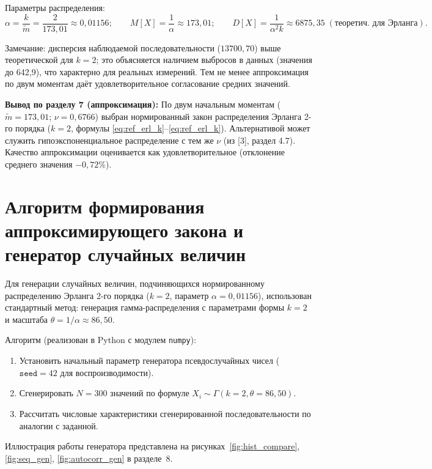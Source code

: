 \documentclass[a4paper,12pt]{article}
\begin{document}
Параметры распределения:
\begin{equation*}
\alpha = \frac{k}{\tilde{m}} = \frac{2}{173{,}01} \approx 0{,}01156; \qquad
M[X] = \frac{1}{\alpha} \approx 173{,}01; \qquad D[X] = \frac{1}{\alpha^2 k} \approx 6875{,}35 \; (\text{теоретич. для Эрланга}).
\end{equation*}

Замечание: дисперсия наблюдаемой последовательности ($13700{,}70$) выше теоретической для $k=2$; это объясняется наличием выбросов в данных (значения до 642,9), что характерно для реальных измерений. Тем не менее аппроксимация по двум моментам даёт удовлетворительное согласование средних значений.

\textbf{Вывод по разделу 7 (аппроксимация):} По двум начальным моментам ($\tilde{m}=173{,}01$; $\nu=0{,}6766$) выбран нормированный закон распределения Эрланга 2-го порядка ($k=2$, формулы \ref{eq:ref_erl_k}–\ref{eq:ref_erl_k}). Альтернативой может служить гипоэкспоненциальное распределение с тем же $\nu$ (из [3], раздел 4.7). Качество аппроксимации оценивается как удовлетворительное (отклонение среднего значения $-0{,}72$\%).

\section{Алгоритм формирования аппроксимирующего закона и генератор случайных величин}

Для генерации случайных величин, подчиняющихся нормированному распределению Эрланга 2-го порядка ($k=2$, параметр $\alpha = 0{,}01156$), использован стандартный метод: генерация гамма-распределения с параметрами формы $k=2$ и масштаба $\theta = 1/\alpha \approx 86{,}50$.

Алгоритм (реализован в Python с модулем \texttt{numpy}):
\begin{enumerate}
    \item Установить начальный параметр генератора псевдослучайных чисел ($\texttt{seed}=42$ для воспроизводимости).
    \item Сгенерировать $N=300$ значений по формуле $X_i \sim \Gamma(k=2, \theta = 86{,}50)$.
    \item Рассчитать числовые характеристики сгенерированной последовательности по аналогии с заданной.
\end{enumerate}

Иллюстрация работы генератора представлена на рисунках~\ref{fig:hist_compare}, \ref{fig:seq_gen}, \ref{fig:autocorr_gen} в разделе~8.
\end{document}
